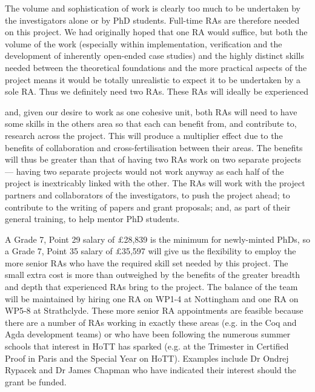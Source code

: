 \documentclass[a4paper,11pt]{article}
\begin{document}
\vspace{0.02in}



The volume and sophistication of work is clearly too much to be
undertaken by the investigators alone or by PhD students.  Full-time
RAs are therefore needed on this project. We had originally hoped that
one RA would suffice, but both the volume of the work (especially
within implementation, verification and the development of inherently
open-ended case studies) and the highly distinct skills needed between
the theoretical foundations and the more practical aspects of the
project means it would be totally unrealistic to expect it to be
undertaken by a sole RA. Thus we definitely need two RAs. These RAs
will ideally be experienced


 and, given
our desire to work as one cohesive unit, both RAs will need to have
some skills in the others area so that each can benefit from, and
contribute to, research across the project. This will produce a
multiplier effect due to the benefits of collaboration and
cross-fertilisation between their areas. The benefits will thus be
greater than that of having two RAs work on two separate projects ---
having two separate projects would not work anyway as each half of the
project is inextricably linked with the other.  The RAs will work with
the project partners and collaborators of the investigators, to push
the project ahead; to contribute to the writing of papers and grant
proposals; and, as part of their general training, to help mentor PhD
students. 


A Grade 7, Point 29 salary of $\pounds$28,839 is the minimum
for newly-minted PhDs, so a Grade 7, Point 35 salary of
$\pounds$35,597 will give us the flexibility to employ the more senior
RAs who have the required skill set needed by this project. The
small extra cost is more than outweighed by the benefits of the
greater breadth and depth that experienced RAs bring to the
project. The balance of the team will be maintained by hiring one RA
on WP1-4 at Nottingham and one RA on WP5-8 at Strathclyde. These more
senior RA appointments are feasible because there are a number of RAs
working in exactly these areas (e.g. in the Coq and Agda development
teams) or who have been following the numerous summer schools that
interest in HoTT has sparked (e.g. at the Trimester in Certified Proof
in Paris and the Special Year on HoTT). Examples include Dr Ondrej
Rypacek and Dr James Chapman who have indicated their interest should the grant be funded.
\end{document}
